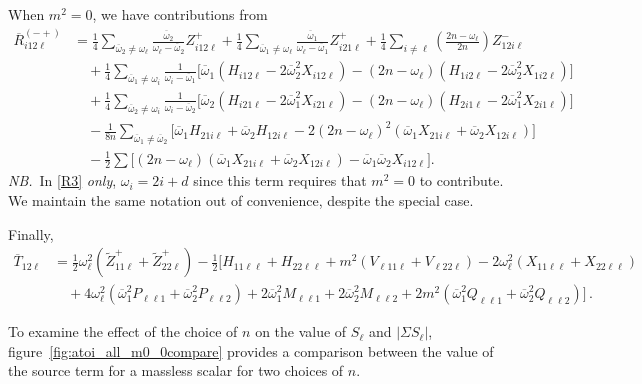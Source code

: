 \documentclass[letterpaper,11pt]{article}
\newcommand{\oi}{\omega_i}
\newcommand{\ol}{\omega_\ell}
\newcommand{\oone}{\overline{\omega}_1}
\newcommand{\otwo}{\overline{\omega}_2}
\begin{document}
When $m^2 = 0$, we have contributions from
\begin{align}
\label{R3}
\overline{R}_{i12\ell}^{(-+)} &=  \frac{1}{4} \sum_{\otwo \neq \ol} \frac{\otwo}{\ol - \otwo} Z^+_{i12\ell} + \frac{1}{4} \sum_{\oone \neq \ol} \frac{\oone}{\ol - \oone} Z^+_{i21\ell} + \frac{1}{4} \sum_{i \neq \ell} \left( \frac{2n - \ol}{2n} \right) Z^-_{12i\ell} \nonumber \\
%
& \quad + \frac{1}{4} \sum_{\oone \neq \oi} \frac{1}{\oi - \oone} \Big[ \oone \left( H_{i12\ell} - 2\otwo^2 X_{i12\ell} \right) - (2n - \ol) \left( H_{1i2\ell} - 2\otwo^2 X_{1i2\ell} \right) \Big] \nonumber \\
%
& \quad + \frac{1}{4} \sum_{\otwo \neq \oi} \frac{1}{\oi - \otwo} \Big[ \otwo \left( H_{i21\ell} - 2\oone^2 X_{i21\ell} \right) - (2n - \ol) \left( H_{2i1\ell} - 2\oone^2 X_{2i1\ell} \right) \Big] \nonumber \\
%
& \quad - \frac{1}{8n} \sum_{\oone \neq \otwo} \Big[ \oone H_{21i\ell} + \otwo H_{12i\ell} - 2 \left( 2n - \ol \right)^2 \left(\oone X_{21i\ell} + \otwo X_{12i\ell} \right) \Big] \nonumber \\
%
& \quad - \frac{1}{2} \sum \Big[ (2n - \ol) \left( \oone X_{21i\ell} + \otwo X_{12i\ell} \right) - \oone \otwo X_{i12\ell} \Big] .
\end{align}
{\it NB.}\, In \eqref{R3} \emph{only}, $\oi = 2i + d$ since this term requires that $m^2 = 0$ to contribute. We maintain the same notation out of convenience, despite the special case.

Finally, 
\begin{align}
\label{T12}
\overline{T}_{12\ell} &=  \frac{1}{2} \ol^2 \left( \tilde{Z}^+_{11\ell} + \tilde{Z}^+_{22\ell} \right)- \frac{1}{2} \Big[ H_{11\ell\ell} + H_{22\ell\ell} + m^2 \left( V_{\ell 1 1 \ell} + V_{\ell 2 2 \ell} \right) - 2 \ol^2 \left( X_{11\ell\ell} + X_{22\ell\ell} \right)  \nonumber \\
%
& \quad + 4 \ol^2 \left( \oone^2 P_{\ell \ell 1} + \otwo^2 P_{\ell \ell 2} \right) + 2\oone^2 M_{\ell \ell 1} + 2\otwo^2 M_{\ell \ell 2} + 2m^2 \left( \oone^2 Q_{\ell\ell 1} + \otwo^2 Q_{\ell \ell 2} \right) \Big] \, .
\end{align}

To examine the effect of the choice of $n$ on the value of $S_\ell$ and $| \Sigma S_\ell |$, figure~\ref{fig:atoi_all_m0_0compare} provides a comparison between the value of the source term for a massless scalar for two choices of $n$.
\end{document}
